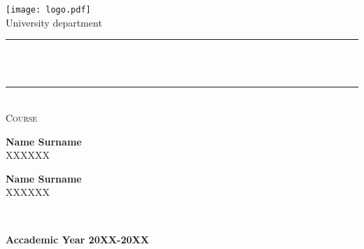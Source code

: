 \newpage
\pagestyle{empty} %
\noindent

\begin{titlepage}
	\centering
	\texttt{[image: logo.pdf]}\\[1 cm]
	{\large University department}\\[1.2 
	cm]	
	\rule{\linewidth}{0.2 mm} \\[0.4 cm]
	{ \huge \bfseries \thetitle}\\
	\rule{\linewidth}{0.2 mm} \\[1.0 cm]
	
	\textsc{\Large Course}\\[2.2 cm]	
	
		\begin{minipage}{.4\linewidth}
			\begin{flushleft}                           
				\textbf{Name Surname} \\
				\quad \: {XXXXXX}
			\end{flushleft} 
		\end{minipage}
		\hspace{-90mm}
		\begin{minipage}{.4\linewidth}
			\begin{flushright}                                      
				\textbf{Name Surname} \\ 
				{XXXXXX}\quad \: { }
			\end{flushright} 
		\end{minipage}\\[1 cm]

	\begin{center} \textbf{Accademic Year 20XX-20XX }\end{center}
	
\end{titlepage}
